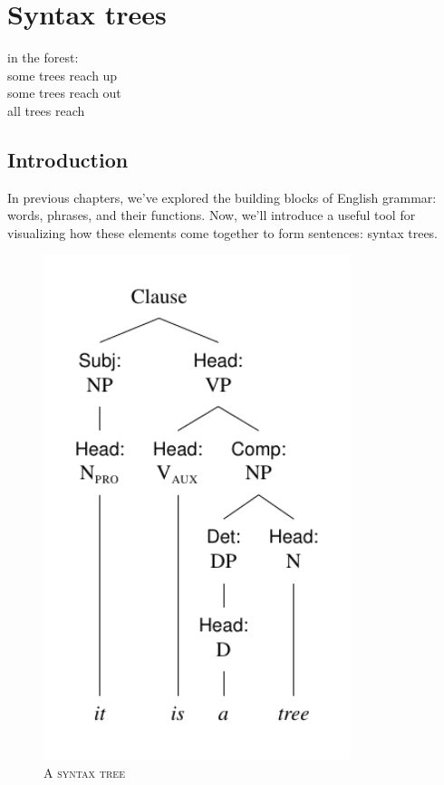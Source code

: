 \chapter{Syntax trees}

\epigraph{in the forest:\\
some trees reach up\\
some trees reach out\\
all trees reach}{}

\section{Introduction}

In previous chapters, we've explored the building blocks of English grammar: words, phrases, and their functions. Now, we'll introduce a useful tool for visualizing how these elements come together to form sentences: syntax trees.

\begin{figure} %
  \centering
  \includegraphics[width=0.8\textwidth]{figures/itisatree.pdf}
  \caption{A \textsc{syntax tree}}
  \label{fig:tree1}
\end{figure}

